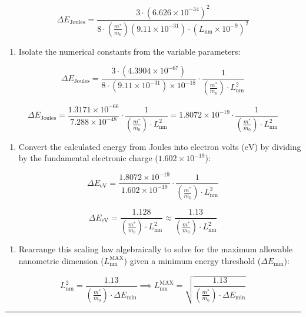 \documentclass[
]{article}
\providecommand{\tightlist}{%
  \setlength{\itemsep}{0pt}\setlength{\parskip}{0pt}}
\begin{document}
\[\Delta E_{\text{Joules}} = \frac{3 \cdot (6.626 \times 10^{-34})^2}{8 \cdot \left(\frac{m^*}{m_0}\right)(9.11 \times 10^{-31}) \cdot (L_{\text{nm}} \times 10^{-9})^2}\]

\begin{enumerate}
\def\labelenumi{\arabic{enumi}.}
\setcounter{enumi}{2}
\tightlist
\item
  Isolate the numerical constants from the variable parameters:
\end{enumerate}

\[\Delta E_{\text{Joules}} = \frac{3 \cdot (4.3904 \times 10^{-67})}{8 \cdot (9.11 \times 10^{-31}) \times 10^{-18}} \cdot \frac{1}{\left(\frac{m^*}{m_0}\right) \cdot L_{\text{nm}}^2}\]

\[\Delta E_{\text{Joules}} = \frac{1.3171 \times 10^{-66}}{7.288 \times 10^{-48}} \cdot \frac{1}{\left(\frac{m^*}{m_0}\right) \cdot L_{\text{nm}}^2} = 1.8072 \times 10^{-19} \cdot \frac{1}{\left(\frac{m^*}{m_0}\right) \cdot L_{\text{nm}}^2}\]

\begin{enumerate}
\def\labelenumi{\arabic{enumi}.}
\setcounter{enumi}{3}
\tightlist
\item
  Convert the calculated energy from Joules into electron volts
  (\(\text{eV}\)) by dividing by the fundamental electronic charge
  (\(1.602 \times 10^{-19}\)):
\end{enumerate}

\[\Delta E_{\text{eV}} = \frac{1.8072 \times 10^{-19}}{1.602 \times 10^{-19}} \cdot \frac{1}{\left(\frac{m^*}{m_0}\right) \cdot L_{\text{nm}}^2}\]

\[\Delta E_{\text{eV}} = \frac{1.128}{\left(\frac{m^*}{m_0}\right) \cdot L_{\text{nm}}^2} \approx \frac{1.13}{\left(\frac{m^*}{m_0}\right) \cdot L_{\text{nm}}^2}\]

\begin{enumerate}
\def\labelenumi{\arabic{enumi}.}
\setcounter{enumi}{4}
\tightlist
\item
  Rearrange this scaling law algebraically to solve for the maximum
  allowable nanometric dimension (\(L_{\text{nm}}^{\text{MAX}}\)) given
  a minimum energy threshold (\(\Delta E_{\min}\)):
\end{enumerate}

\[L_{\text{nm}}^2 = \frac{1.13}{\left(\frac{m^*}{m_0}\right) \cdot \Delta E_{\min}} \implies L_{\text{nm}}^{\text{MAX}} = \sqrt{\frac{1.13}{\left(\frac{m^*}{m_0}\right) \cdot \Delta E_{\min}}}\]

\begin{center}\rule{0.5\linewidth}{0.5pt}\end{center}
\end{document}
